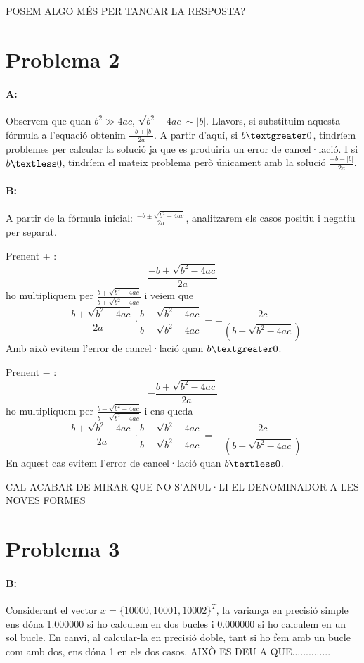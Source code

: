 \documentclass{article}
\begin{document}
	POSEM ALGO MÉS PER TANCAR LA RESPOSTA?
	
	\newpage
	
	\section{Problema 2}
	\paragraph{A:} Observem que quan $b^2 \gg 4ac$, $\sqrt{b^2-4ac}\sim|b|$. Llavors, si substituim aquesta fórmula a l'equació obtenim $\frac{-b\pm|b|}{2a}$. A partir d'aquí, si $b\textgreater0$, tindríem problemes per calcular la solució ja que es produiria un error de cancel·lació. I si $b\textless0$, tindríem el mateix problema però únicament amb la solució $\frac{-b-|b|}{2a}$.
	
	\paragraph{B:} A partir de la fórmula inicial: $\frac{-b\pm\sqrt{b^2-4ac}}{2a}$, analitzarem els casos positiu i negatiu per separat.
	
	Prenent + : $$\frac{-b+\sqrt{b^2-4ac}}{2a}$$ ho multipliquem per $\frac{b+\sqrt{b^2-4ac}}{b+\sqrt{b^2-4ac}}$ i veiem que 
	$$\frac{-b+\sqrt{b^2-4ac}}{2a}\cdot\frac{b+\sqrt{b^2-4ac}}{b+\sqrt{b^2-4ac}}=-\frac{2c}{(b+\sqrt{b^2-4ac})}$$
	Amb això evitem l'error de cancel·lació quan $b\textgreater0$.
	
	Prenent $-$ : $$-\frac{b+\sqrt{b^2-4ac}}{2a}$$
	ho multipliquem per $\frac{b-\sqrt{b^2-4ac}}{b-\sqrt{b^2-4ac}}$ i ens queda 
	$$-\frac{b+\sqrt{b^2-4ac}}{2a}\cdot\frac{b-\sqrt{b^2-4ac}}{b-\sqrt{b^2-4ac}}=-\frac{2c}{(b-\sqrt{b^2-4ac})}$$
	En aquest cas evitem l'error de cancel·lació quan $b\textless0$.
	
	CAL ACABAR DE MIRAR QUE NO S'ANUL·LI EL DENOMINADOR A LES NOVES FORMES
	
	
	\newpage
	
	\section{Problema 3}
	\paragraph{B:} Considerant el vector $x={\{10000,10001,10002\}}^T$, la variança en precisió simple ens dóna 1.000000 si ho calculem en dos bucles i 0.000000 si ho calculem en un sol bucle. En canvi, al calcular-la en precisió doble, tant si ho fem amb un bucle com amb dos, ens dóna 1 en els dos casos. AIXÒ ES DEU A QUE..............
	
\end{document}
